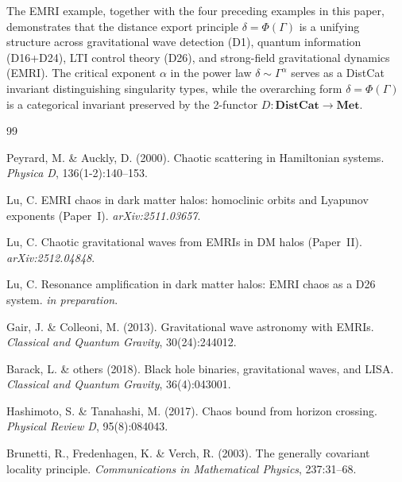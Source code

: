 The EMRI example, together with the four preceding examples in this paper, demonstrates that the distance export principle $\delta = \Phi(\Gamma)$ is a unifying structure across gravitational wave detection (D1), quantum information (D16+D24), LTI control theory (D26), and strong-field gravitational dynamics (EMRI). The critical exponent $\alpha$ in the power law $\delta \sim \Gamma^\alpha$ serves as a DistCat invariant distinguishing singularity types, while the overarching form $\delta = \Phi(\Gamma)$ is a categorical invariant preserved by the 2-functor $D: \mathbf{DistCat} \to \mathbf{Met}$.

\begin{thebibliography}{99}

Peyrard, M. \& Auckly, D. (2000). Chaotic scattering in Hamiltonian systems.
\emph{Physica D}, 136(1-2):140--153.

Lu, C. EMRI chaos in dark matter halos: homoclinic orbits and Lyapunov exponents (Paper~I). \emph{arXiv:2511.03657}.

Lu, C. Chaotic gravitational waves from EMRIs in DM halos (Paper~II). \emph{arXiv:2512.04848}.

Lu, C. Resonance amplification in dark matter halos: EMRI chaos as a D26 system. \emph{in preparation}.

Gair, J. \& Colleoni, M. (2013). Gravitational wave astronomy with EMRIs.
\emph{Classical and Quantum Gravity}, 30(24):244012.

Barack, L. \& others (2018). Black hole binaries, gravitational waves, and LISA.
\emph{Classical and Quantum Gravity}, 36(4):043001.

Hashimoto, S. \& Tanahashi, M. (2017). Chaos bound from horizon crossing.
\emph{Physical Review D}, 95(8):084043.

Brunetti, R., Fredenhagen, K. \& Verch, R. (2003). The generally covariant locality principle.
\emph{Communications in Mathematical Physics}, 237:31--68.

\end{thebibliography}
